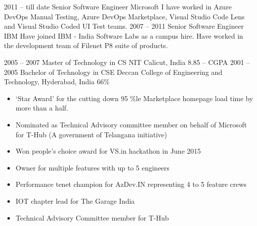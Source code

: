 \documentclass[9pt]{developercv} %
\begin{document}
\begin{entrylist}
	\entry
		{2011 -- till date}
		{Senior Software Engineer}
		{Microsoft}
		{I have worked in Azure DevOps Manual Testing, Azure DevOps Marketplace, Visual Studio Code Lens and Visual Studio Coded UI Test teams.}
	\entry
		{2007 -- 2011}
		{Senior Software Engineer}
		{IBM}
		{Have joined IBM - India Software Labs as a campus hire. Have worked in the development team of Filenet P8 suite of products.}
\end{entrylist}



\begin{entrylist}
	\entry
		{2005 -- 2007}
		{Master of Technology in CS}
		{NIT Calicut, India}
		{8.85 -- CGPA}
	\entry
		{2001 -- 2005}
		{Bachelor of Technology in CSE}
		{Deccan College of Engineering and Technology, Hyderabad, India}
		{66\%}
\end{entrylist}

\begin{itemize}
  \item ‘Star Award’ for the cutting down 95 \%le Marketplace homepage load time by more than a half.
  \item Nominated as Technical Advisory committee member on behalf of Microsoft for T-Hub (A government of Telangana initiative)
  \item Won people’s choice award for VS.in hackathon in June 2015
\end{itemize}

\begin{itemize}
  \item Owner for multiple features with up to 5 engineers
  \item Performance tenet champion for AzDev.IN representing 4 to 5 feature crews
  \item IOT chapter lead for The Garage India
  \item Technical Advisory Committee member for T-Hub
\end{itemize}

\end{document}
